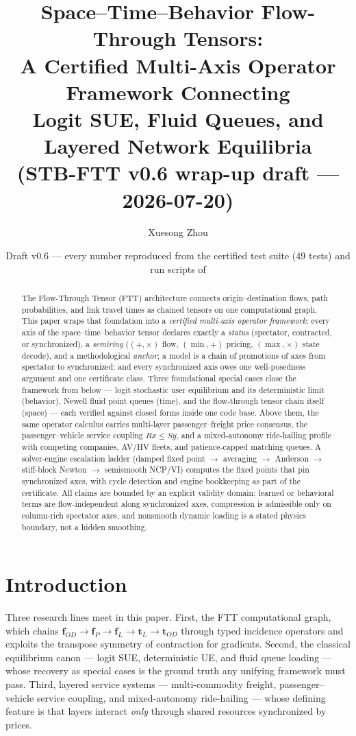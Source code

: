 \documentclass[11pt]{article}
\title{Space--Time--Behavior Flow-Through Tensors:\\
A Certified Multi-Axis Operator Framework Connecting\\
Logit SUE, Fluid Queues, and Layered Network Equilibria\\
{\large (STB-FTT v0.6 wrap-up draft --- 2026-07-20)}}
\author{Xuesong Zhou \and \red{[co-authors TBD]}}
\date{Draft v0.6 --- every number reproduced from the certified test
suite (49 tests) and run scripts of \code{stb\_ftt\_unified\_v0.6}}
\begin{document}
\maketitle

\begin{abstract}
The Flow-Through Tensor (FTT) architecture connects origin--destination
flows, path probabilities, and link travel times as chained tensors on
one computational graph. This paper wraps that foundation into a
\emph{certified multi-axis operator framework}: every axis of the
space--time--behavior tensor declares exactly a \emph{status}
(spectator, contracted, or synchronized), a \emph{semiring}
($(+,\times)$ flow, $(\min,+)$ pricing, $(\max,\times)$ state decode),
and a methodological \emph{anchor}; a model is a chain of promotions of
axes from spectator to synchronized; and every synchronized axis owes
one well-posedness argument and one certificate class. Three
foundational special cases close the framework from below --- logit
stochastic user equilibrium and its deterministic limit (behavior),
Newell fluid point queues (time), and the flow-through tensor chain
itself (space) --- each verified against closed forms inside one code
base. Above them, the same operator calculus carries multi-layer
passenger--freight price consensus, the passenger--vehicle service
coupling $Rx \le Sy$, and a mixed-autonomy ride-hailing profile with
competing companies, AV/HV fleets, and patience-capped matching queues.
A solver-engine escalation ladder (damped fixed point $\to$ averaging
$\to$ Anderson $\to$ stiff-block Newton $\to$ semismooth NCP/VI)
computes the fixed points that pin synchronized axes, with cycle
detection and engine bookkeeping as part of the certificate. All
claims are bounded by an explicit validity domain: learned or
behavioral terms are flow-independent along synchronized axes,
compression is admissible only on column-rich spectator axes, and
nonsmooth dynamic loading is a stated physics boundary, not a hidden
smoothing.
\end{abstract}

\section{Introduction}

Three research lines meet in this paper. First, the FTT computational
graph, which chains $\mathbf f_{OD} \to \mathbf f_P \to \mathbf f_L \to
\mathbf t_L \to \mathbf t_{OD}$ through typed incidence operators and
exploits the transpose symmetry of contraction for gradients. Second,
the classical equilibrium canon --- logit SUE, deterministic UE, and
fluid queue loading --- whose recovery as special cases is the ground
truth any unifying framework must pass. Third, layered service systems
--- multi-commodity freight, passenger--vehicle service coupling, and
mixed-autonomy ride-hailing --- whose defining feature is that layers
interact \emph{only} through shared resources synchronized by prices.
\end{document}
